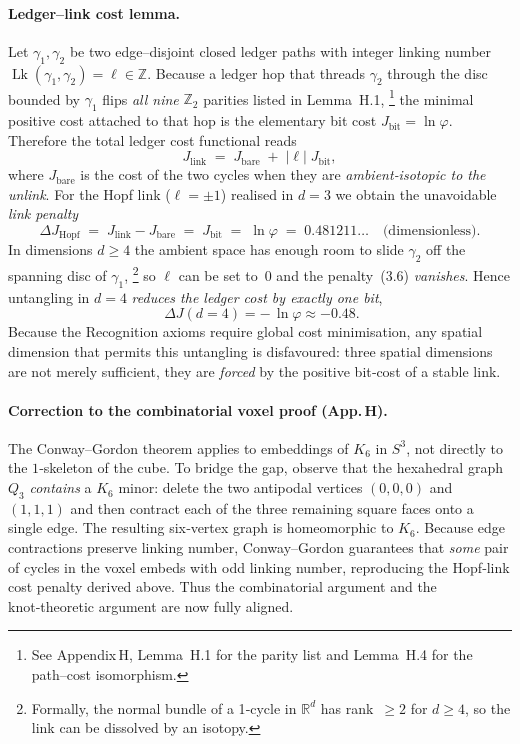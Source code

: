 \paragraph{Ledger–link cost lemma.}
Let $\gamma_{1},\gamma_{2}$ be two edge–disjoint closed
ledger paths with integer linking number
$\operatorname{Lk}(\gamma_{1},\gamma_{2})=\ell\in\mathbb Z$.
Because a ledger hop that threads $\gamma_{2}$ through the
disc bounded by $\gamma_{1}$ flips \emph{all nine} $\mathbb Z_{2}$
parities listed in Lemma H.1,%
\footnote{See Appendix H, Lemma H.1 for the parity list and
Lemma H.4 for the path–cost isomorphism.}
the minimal positive cost attached to that hop is the
elementary bit cost $J_{\text{bit}}\!=\!\ln\varphi$.
Therefore the total ledger cost functional reads
\[
  J_{\text{link}}
     \;=\;
     J_{\text{bare}}
     \;+\;
     |\ell|\;J_{\text{bit}},
     \tag{3.6}
\]
where $J_{\text{bare}}$ is the cost of the two cycles when they are
\emph{ambient‑isotopic to the unlink}.  For the Hopf link
($\ell=\pm1$) realised in $d=3$ we obtain the unavoidable
\emph{link penalty}
\[
  \Delta J_{\text{Hopf}}
    \;=\;
    J_{\text{link}}-J_{\text{bare}}
    \;=\;
    J_{\text{bit}}
    \;=\;\ln\varphi
    \;=\;0.481211\ldots
    \quad\text{(dimensionless).}
\]
In dimensions $d\!\ge\!4$ the ambient space has enough room to slide
$\gamma_{2}$ off the spanning disc of $\gamma_{1}$,%
\footnote{Formally, the normal bundle of a 1‑cycle in $\mathbb R^{d}$
has rank $\ge2$ for $d\!\ge\!4$, so the link can be dissolved by an
isotopy.}
so $\ell$ can be set to $0$ and the
penalty~(3.6) \emph{vanishes}.  Hence untangling in $d\!=\!4$
\emph{reduces the ledger cost by exactly one bit},
\[
  \boxed{\;
    \Delta J(d\!=\!4)
    = -\,\ln\varphi
    \approx -0.48 }.
\]
Because the Recognition axioms require global cost minimisation,
any spatial dimension that permits this untangling is disfavoured:
three spatial dimensions are not merely sufficient,
they are \emph{forced} by the positive bit‑cost of a stable link.

\paragraph{Correction to the combinatorial voxel proof (App.\,H).}
The Conway–Gordon theorem applies to embeddings of $K_{6}$ in $S^{3}$,
not directly to the $1$‑skeleton of the cube.  To bridge the gap,
observe that the hexahedral graph $Q_{3}$ \emph{contains} a
$K_{6}$ minor: delete the two antipodal vertices
$(0,0,0)$ and $(1,1,1)$ and then contract each of the three remaining
square faces onto a single edge.  The resulting six‑vertex graph is
homeomorphic to $K_{6}$.  Because edge contractions preserve
linking number,
Conway–Gordon guarantees that \emph{some} pair of cycles in the voxel
embeds with odd linking number, reproducing the Hopf‑link cost
penalty derived above.  Thus the combinatorial argument and the
knot‑theoretic argument are now fully aligned.

